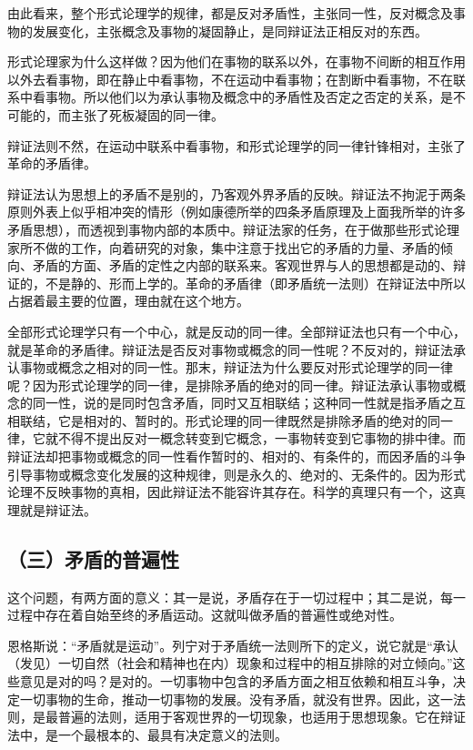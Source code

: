 由此看来，整个形式论理学的规律，都是反对矛盾性，主张同一性，反对概念及事物的发展变化，主张概念及事物的凝固静止，是同辩证法正相反对的东西。

形式论理家为什么这样做？因为他们在事物的联系以外，在事物不间断的相互作用以外去看事物，即在静止中看事物，不在运动中看事物；在割断中看事物，不在联系中看事物。所以他们以为承认事物及概念中的矛盾性及否定之否定的关系，是不可能的，而主张了死板凝固的同一律。

辩证法则不然，在运动中联系中看事物，和形式论理学的同一律针锋相对，主张了革命的矛盾律。

辩证法认为思想上的矛盾不是别的，乃客观外界矛盾的反映。辩证法不拘泥于两条原则外表上似乎相冲突的情形（例如康德所举的四条矛盾原理及上面我所举的许多矛盾思想），而透视到事物内部的本质中。辩证法家的任务，在于做那些形式论理家所不做的工作，向着研究的对象，集中注意于找出它的矛盾的力量、矛盾的倾向、矛盾的方面、矛盾的定性之内部的联系来。客观世界与人的思想都是动的、辩证的，不是静的、形而上学的。革命的矛盾律（即矛盾统一法则）在辩证法中所以占据着最主要的位置，理由就在这个地方。

全部形式论理学只有一个中心，就是反动的同一律。全部辩证法也只有一个中心，就是革命的矛盾律。辩证法是否反对事物或概念的同一性呢？不反对的，辩证法承认事物或概念之相对的同一性。那末，辩证法为什么要反对形式论理学的同一律呢？因为形式论理学的同一律，是排除矛盾的绝对的同一律。辩证法承认事物或概念的同一性，说的是同时包含矛盾，同时又互相联结；这种同一性就是指矛盾之互相联结，它是相对的、暂时的。形式论理的同一律既然是排除矛盾的绝对的同一律，它就不得不提出反对一概念转变到它概念，一事物转变到它事物的排中律。而辩证法却把事物或概念的同一性看作暂时的、相对的、有条件的，而因矛盾的斗争引导事物或概念变化发展的这种规律，则是永久的、绝对的、无条件的。因为形式论理不反映事物的真相，因此辩证法不能容许其存在。科学的真理只有一个，这真理就是辩证法。

\subsection{（三）矛盾的普遍性}

这个问题，有两方面的意义：其一是说，矛盾存在于一切过程中；其二是说，每一过程中存在着自始至终的矛盾运动。这就叫做矛盾的普遍性或绝对性。

恩格斯说：“矛盾就是运动”。列宁对于矛盾统一法则所下的定义，说它就是“承认（发见）一切自然（社会和精神也在内）现象和过程中的相互排除的对立倾向。”这些意见是对的吗？是对的。一切事物中包含的矛盾方面之相互依赖和相互斗争，决定一切事物的生命，推动一切事物的发展。没有矛盾，就没有世界。因此，这一法则，是最普遍的法则，适用于客观世界的一切现象，也适用于思想现象。它在辩证法中，是一个最根本的、最具有决定意义的法则。

